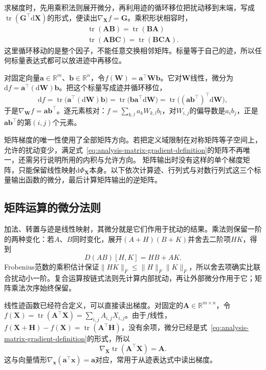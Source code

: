 求梯度时，先用乘积法则展开微分，再利用迹的循环移位把扰动移到末端，写成$\operatorname{tr}(\bm G^\top\mathrm d\bm X)$的形式，便读出$\nabla_{\bm X}f=\bm G$。乘积形状相容时，
\[
 \begin{gathered}
\operatorname{tr}(\bm A\bm B)=\operatorname{tr}(\bm B\bm A)\\
\operatorname{tr}(\bm A\bm B\bm C)=\operatorname{tr}(\bm B\bm C\bm A).
 \end{gathered}
\]
这里循环移动的是整个因子，不能任意交换相邻矩阵。标量等于自己的迹，所以任何标量表达式都可以放进迹中再移位。
\begin{example}[双线性函数的矩阵梯度]
\label{ex:multivariable-bilinear-matrix-gradient}
对固定向量$\bm a\in\mathbb R^m$、$\bm b\in\mathbb R^n$，令$f(\bm W)=\bm a^\top\bm W\bm b$。它对$\bm W$线性，微分为$\mathrm df=\bm a^\top(\mathrm d\bm W)\bm b$。把这个标量写成迹并循环移位，
\[
 \mathrm df=\operatorname{tr}\bigl(\bm a^\top(\mathrm d\bm W)\bm b\bigr)=\operatorname{tr}\bigl(\bm b\bm a^\top\mathrm d\bm W\bigr)
 =\operatorname{tr}\bigl((\bm a\bm b^\top)^\top\mathrm d\bm W\bigr),
\]
于是$\nabla_{\bm W}f=\bm a\bm b^\top$。逐元素核对：$f=\sum_{k,l}a_kW_{k,l}b_l$，对$W_{i,j}$的偏导数是$a_ib_j$，正是$\bm a\bm b^\top$的第$(i,j)$个元素。
\end{example}

矩阵梯度的唯一性使用了全部矩阵方向。若把定义域限制在对称矩阵等子空间上，允许的扰动变少，满足式~\eqref{eq:analysis-matrix-gradient-definition}的矩阵不再唯一，还需另行说明所用的内积与允许方向。
矩阵输出时没有这样的单个梯度矩阵，只能保留线性映射$\mathrm d\Phi_{\bm X}$本身。以下依次计算迹、行列式与对数行列式这三个标量输出函数的微分，最后计算矩阵输出的逆矩阵。

\subsection{矩阵运算的微分法则}

加法、转置与迹是线性映射，其微分就是它们作用于扰动的结果。乘法则保留一阶的两种变化：若$A$、$B$同时变化，展开$(A+H)(B+K)$并舍去二阶项$HK$，得到
\[
 D(AB)[H,K]=HB+AK.
\]
Frobenius范数的乘积估计保证$\|HK\|_F\leq\|H\|_F\|K\|_F$，所以舍去项确实比联合扰动小一阶。复合运算按链式法则先计算内部扰动，再让外部微分作用于它；矩阵乘法次序始终保留。

线性迹函数已经符合定义，可以直接读出梯度。对固定的$\bm{A}\in\mathbb{R}^{m\times n}$，令$f(\bm{X})=\operatorname{tr}(\bm{A}^{\top}\bm{X})=\sum_{i,j}A_{i,j}X_{i,j}$。由于$f$线性，$f(\bm X+\bm H)-f(\bm X)=\operatorname{tr}(\bm A^\top\bm H)$，没有余项，微分已经是式~\eqref{eq:analysis-matrix-gradient-definition}的形式，所以
\begin{equation}
  \nabla_{\bm{X}}\operatorname{tr}(\bm{A}^{\top}\bm{X})
  =\bm{A}.
\label{eq:analysis-trace-linear-gradient}
\end{equation}
这与向量情形$\nabla_{\bm x}(\bm a^\top\bm x)=\bm a$对应，常用于从迹表达式中读出梯度。

